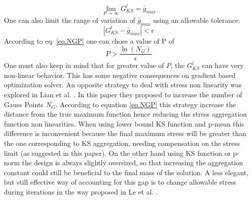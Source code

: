 \begin{equation}
\lim\limits_{P\rightarrow \infty}G^{l}_{KS}=\bar{g}_{max}
\end{equation}
One can also limit the range of variation of $\bar{g}_{max}$ using an allowable tolerance: 
\begin{equation}
\left|G^{l}_{KS}-\bar{g}_{max}\right|<\epsilon 
\end{equation}
According to eq. \eqref{eq.NGP} one can chose a value of P of
\begin{equation}
  P>\frac{\ln\left(N_G\right)}{\epsilon} 
\end{equation}
One must also keep in mind that for greater value of $P$, the $G_{KS}^l$ can have very non-linear behavior. This has some negative consequences on gradient based optimization solver. An opposite strategy to deal with stress non linearity was explored in Lian et al. \cite{lian2017combined}. In this paper they proposed to increase the number of Gauss Points $N_G$. According to equation \eqref{eq.NGP} this strategy increase the distance from the true maximum function hence reducing the stress aggregation function non linearities. When using lower bound KS function and p-mean this difference is inconvenient because the final maximum stress will be greater than the one  corresponding to KS aggregation, needing compensation on the stress limit (as suggested in this paper). On the other hand using KS function or p-norm the design is always slightly oversized, so that increasing the aggregation constant could still be beneficial to the final mass of the solution. A less elegant, but still effective way of accounting for this gap is to change allowable stress during iterations in the way proposed in Le et al. \cite{le2010stress}.   
